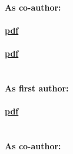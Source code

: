 \documentclass[a4paper,11pt]{article}
\begin{document}
\noindent\textbf{As co-author:}\\\\
 \textcolor{red}{\textbf{\lbrack\href{http://prosodia.upf.edu/home/arxiu/publicacions/borras/borras-et-al_audiovisual-correlates-interrogativity.pdf}{pdf}\rbrack}}\\\\
 \textcolor{red}{\textbf{\lbrack\href{http://prosodia.upf.edu/home/arxiu/publicacions/crespo/crespo_perceiving-incredulity.pdf}{pdf}\rbrack}}

\newpage
\section*{}
\textbf{As first author:}\\\\
 \textcolor{red}{\textbf{\lbrack\href{http://www.lotpublications.nl/Documents/366_fulltext.pdf}{pdf}\rbrack}}\\\\\\
\textbf{As co-author:}\\\\

\newpage
\end{document}
